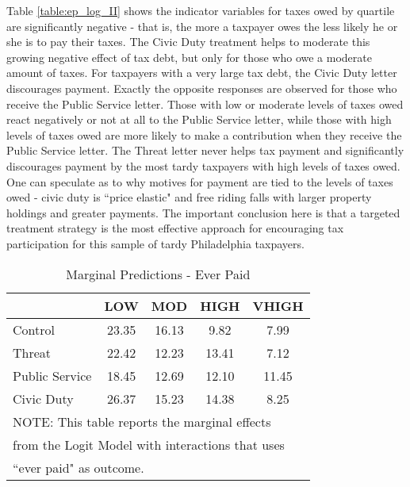 \documentclass[12pt,titlepage]{article}
\begin{document}
Table \ref{table:ep_log_II} shows the indicator variables for taxes owed by
quartile are significantly negative - that is, the more a taxpayer
owes the less likely he or she is to pay their taxes.  The Civic Duty
treatment helps to moderate this growing negative effect of tax debt,
but only for those who owe a moderate amount of taxes.  For taxpayers
with a very large tax debt, the Civic Duty letter discourages payment.
Exactly the opposite responses are observed for those who receive the
Public Service letter.  Those with low or moderate levels of taxes
owed react negatively or not at all to the Public Service letter,
while those with high levels of taxes owed are more likely to make a
contribution when they receive the Public Service letter.  The Threat
letter never helps tax payment and significantly discourages payment
by the most tardy taxpayers with high levels of taxes owed.  One can
speculate as to why motives for payment are tied to the levels of
taxes owed - civic duty is ``price elastic" and free riding falls with
larger property holdings and greater payments. The important
conclusion here is that a targeted treatment strategy is the most
effective approach for encouraging tax participation for this sample
of tardy Philadelphia taxpayers.


\begin{table}[htbp]
\caption{Marginal Predictions - Ever Paid} 
\label{table:modelI_marg}
\centering
\begin{tabular}{|l|c|c|c|c|}
  \hline
 & LOW & MOD & HIGH & VHIGH \\ 
  \hline
Control & 23.35 & 16.13 & 9.82 & 7.99 \\ 
  Threat & 22.42 & 12.23 & 13.41 & 7.12 \\ 
  Public Service & 18.45 & 12.69 & 12.10 & 11.45 \\ 
  Civic Duty & 26.37 & 15.23 & 14.38 & 8.25 \\ 
   \hline
\multicolumn{5}{l}{NOTE: This table reports the marginal effects} \\
\multicolumn{5}{l}{from the Logit Model with interactions that uses} \\
\multicolumn{5}{l}{``ever paid" as outcome.} \\
\end{tabular}
\end{table}
\end{document}
